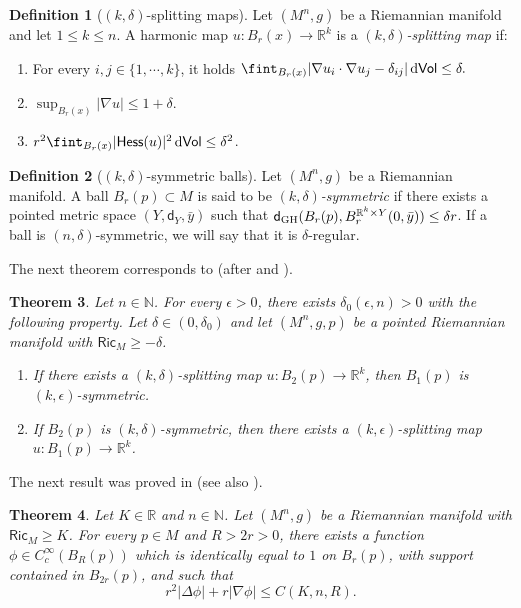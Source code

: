 \documentclass[10pt]{article}
\newtheorem{thm}{Theorem}[section]
\theoremstyle{definition}
\newtheorem{definition}[thm]{Definition}
\newcommand{\bb}[1]{\mathbb{#1}}
\newcommand{\ssf}[1]{\mathsf{#1}}
\newcommand{\Ric}{\mathsf{Ric}}
\newcommand{\Hess}{\mathsf{Hess}}
\newcommand{\sd}{\mathsf{d}}
\newcommand{\de}{{\rm d}}
\begin{document}
\begin{definition}[$(k,\delta)$-splitting maps]\label{def:delta-split-map}
Let $(M^n,g)$ be a Riemannian manifold and let $1\leq k\leq n$. A harmonic map $u:B_r(x) \to \bb{R}^k$ is a \emph{$(k,\delta)$-splitting map} if:
\begin{enumerate}
    \item For every $i,j \in \{1, \cdots,k\}$, it holds
$
\fint_{B_r(x)} | \nabla u_i \cdot \nabla u_j-\delta_{ij}| \, \de \ssf{Vol} \leq \delta.
$
\item $\sup_{B_r(x)} |\nabla u| \leq 1 +\delta$.
\item $r^2 \fint_{B_r(x)} |\Hess(u)|^2 \,\de\ssf{Vol} \leq \delta^2$.
\end{enumerate}
\end{definition}

\begin{definition}[$(k,\delta)$-symmetric balls] \label{D1}
    Let $(M^n,g)$ be a Riemannian manifold. A ball $B_r(p) \subset M$ is said to be \emph{$(k,\delta)$-symmetric} if there exists a pointed metric space $(Y,\sd_Y,\bar{y})$ such that $\sd_{{\rm GH}}(B_r(p),B^{\bb{R}^k \times Y}_r(0,\bar{y})) \leq \delta r$. If a ball is $(n,\delta)$-symmetric, we will say that it is $\delta$-regular.
\end{definition}

The next theorem corresponds to \cite[Theorem $4.11$]{CJN} (after \cite{ChCo1} and \cite{Colding1}).

\begin{thm} \label{T:Fund1}Let $n \in \bb{N}$.
For every $\epsilon>0$, there exists $\delta_0(\epsilon,n)>0$ with the following property. Let $\delta\in (0,\delta_0)$ and let $(M^n,g,p)$ be a pointed Riemannian manifold with $\Ric_{M} \geq -\delta$.
    \begin{enumerate}
        \item If there exists a $(k,\delta)$-splitting map $u:B_2(p) \to \bb{R}^k$, then $B_1(p)$ is $(k,\epsilon)$-symmetric.
        \item \label{ItemThmFund2}
        If $B_2(p)$ is $(k,\delta)$-symmetric, then there exists a $(k,\epsilon)$-splitting map $u:B_1(p) \to \bb{R}^k$.
    \end{enumerate}
\end{thm}

The next result was proved in \cite{ChCo1} (see also \cite{AMSbakry}).

\begin{thm} \label{TGoodCut}
    Let $K \in \bb{R}$ and $n \in \bb{N}$. Let $(M^n,g)$ be a Riemannian manifold with $\Ric_M \geq K$. For every $p \in M$ and $R>2r>0$, there exists a function $\phi \in C^{\infty}_c(B_R(p))$ which is identically equal to $1$ on $B_r(p)$, with support contained in $B_{2r}(p)$, and such that
    \[
    r^2 |\Delta \phi|+r|\nabla \phi| \leq C(K,n,R).
    \]
\end{thm}
\end{document}
